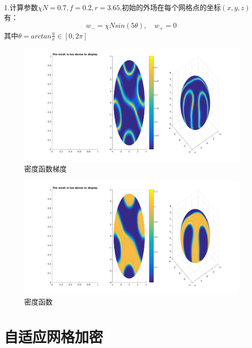 \documentclass{article}
\begin{document}
1.计算参数$\chi N=0.7,f=0.2, r=3.65$,初始的外场在每个网格点的坐标$(x,y,z)$有：
\begin{equation*}
w_-=\chi Nsin(5\theta),\quad w_+=0
\end{equation*}
其中$\theta=arctan\frac{y}{x}\in[0,2\pi]$
\begin{figure}[H]
\centering
\includegraphics[scale=0.5]{./figures/Figure_51.png}
\caption{密度函数梯度}
\end{figure}
\begin{figure}[H]
\centering
\includegraphics[scale=0.5]{./figures/Figure_53.png}
\caption{密度函数}
\end{figure}
\newpage
\section{自适应网格加密}
\end{document}
